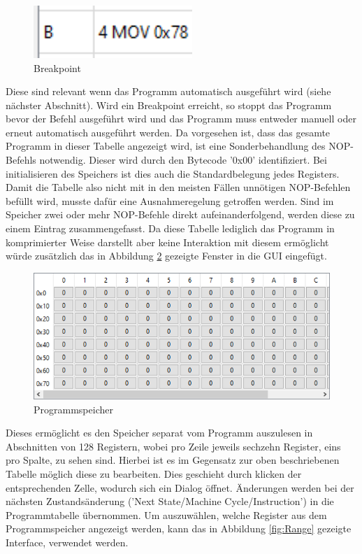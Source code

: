 \documentclass[12pt]{article}
\begin{document}
\begin{figure}[h]
\centering
\includegraphics[width=6cm]{bilder/Breakpoint}
\caption{Breakpoint}
\label{fig:Break}
\end{figure}

\noindent
Diese sind relevant wenn das Programm automatisch ausgeführt wird (siehe nächster Abschnitt). Wird ein Breakpoint erreicht, so stoppt das Programm bevor der Befehl ausgeführt wird und das Programm muss entweder manuell oder erneut automatisch ausgeführt werden. Da vorgesehen ist, dass das gesamte Programm in dieser Tabelle angezeigt wird, ist eine Sonderbehandlung des NOP-Befehls notwendig. Dieser wird durch den Bytecode '0x00' identifiziert. Bei initialisieren des Speichers ist dies auch die Standardbelegung jedes Registers. Damit die Tabelle also nicht mit in den meisten Fällen unnötigen NOP-Befehlen befüllt wird, musste dafür eine Ausnahmeregelung getroffen werden. Sind im Speicher zwei oder mehr NOP-Befehle direkt aufeinanderfolgend, werden diese zu einem Eintrag zusammengefasst. Da diese Tabelle lediglich das Programm in komprimierter Weise darstellt aber keine Interaktion mit diesem ermöglicht würde zusätzlich das in Abbildung \ref{fig:ProgSpeicher} gezeigte Fenster in die GUI eingefügt.\vspace{10pt}

\begin{figure}[h]
\centering
\includegraphics[width=12cm]{bilder/ProgramMemory}
\caption{Programmspeicher}
\label{fig:ProgSpeicher}
\end{figure}

\noindent
Dieses ermöglicht es den Speicher separat vom Programm auszulesen in Abschnitten von 128 Registern, wobei pro Zeile jeweils sechzehn Register, eins pro Spalte, zu sehen sind. Hierbei ist es im Gegensatz zur oben beschriebenen Tabelle möglich diese zu bearbeiten. Dies geschieht durch klicken der entsprechenden Zelle, wodurch sich ein Dialog öffnet. Änderungen werden bei der nächsten Zustandsänderung ('Next State/Machine Cycle/Instruction') in die Programmtabelle übernommen. Um auszuwählen, welche Register aus dem Programmspeicher angezeigt werden, kann das in Abbildung \ref{fig:Range} gezeigte Interface, verwendet werden.\vspace{10pt}
\end{document}
